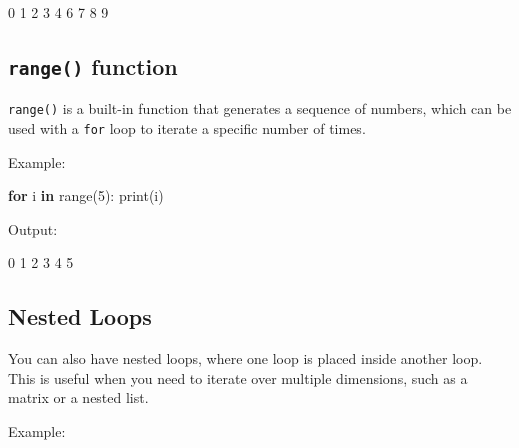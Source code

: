 \documentclass[
  paper=a4,
  ,captions=tableheading
]{scrartcl}
\newenvironment{Shaded}{}{}
\newcommand{\BuiltInTok}[1]{\textcolor[rgb]{0.00,0.50,0.00}{#1}}
\newcommand{\ControlFlowTok}[1]{\textcolor[rgb]{0.00,0.44,0.13}{\textbf{#1}}}
\newcommand{\DecValTok}[1]{\textcolor[rgb]{0.25,0.63,0.44}{#1}}
\newcommand{\ExtensionTok}[1]{#1}
\newcommand{\KeywordTok}[1]{\textcolor[rgb]{0.00,0.44,0.13}{\textbf{#1}}}
\newcommand{\NormalTok}[1]{#1}
\begin{document}
\begin{Shaded}
\begin{Highlighting}[]
\ExtensionTok{0}
\ExtensionTok{1}
\ExtensionTok{2}
\ExtensionTok{3}
\ExtensionTok{4}
\ExtensionTok{6}
\ExtensionTok{7}
\ExtensionTok{8}
\ExtensionTok{9}
\end{Highlighting}
\end{Shaded}

\hypertarget{range-function}{%
\subsection{\texorpdfstring{\texttt{range()}
function}{range() function}}\label{range-function}}

\texttt{range()} is a built-in function that generates a sequence of
numbers, which can be used with a \texttt{for} loop to iterate a
specific number of times.

Example:

\begin{Shaded}
\begin{Highlighting}[]
\ControlFlowTok{for}\NormalTok{ i }\KeywordTok{in} \BuiltInTok{range}\NormalTok{(}\DecValTok{5}\NormalTok{):}
    \BuiltInTok{print}\NormalTok{(i)}
\end{Highlighting}
\end{Shaded}

Output:

\begin{Shaded}
\begin{Highlighting}[]
\ExtensionTok{0}
\ExtensionTok{1}
\ExtensionTok{2}
\ExtensionTok{3}
\ExtensionTok{4}
\ExtensionTok{5}
\end{Highlighting}
\end{Shaded}

\hypertarget{nested-loops}{%
\subsection{Nested Loops}\label{nested-loops}}

You can also have nested loops, where one loop is placed inside another
loop. This is useful when you need to iterate over multiple dimensions,
such as a matrix or a nested list.

Example:
\end{document}

